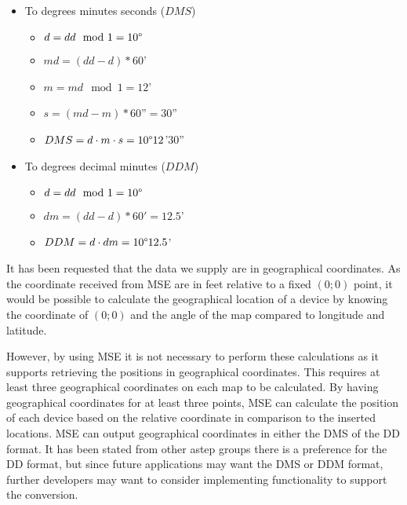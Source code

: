 \begin{itemize}
\begin{itemize}
		\item To degrees minutes seconds ($DMS$)
		\begin{itemize}
			\setlength\itemsep{0.00005em}
			\item $ d = dd \mod 1 = 10\degree $
			\item $ md = (dd - d) * 60$' 
			\item $ m = md \mod 1 = 12$' 
			\item $ s = (md - m) * 60$''$ = 30$''
			\item $ DMS = d \cdot m \cdot s = 10\degree 12$'$ 30$'' 
		\end{itemize}
		\item To degrees decimal minutes ($DDM$)
		\begin{itemize}
			\setlength\itemsep{0.00005em}
			\item $ d = dd \mod 1 = 10\degree $
			\item $ dm = (dd - d) * 60' = 12.5$'
			\item $ DDM = d \cdot dm = 10\degree 12.5$'
		\end{itemize}
	\end{itemize}
\end{itemize}

It has been requested that the data we supply are in geographical coordinates.
As the coordinate received from MSE are in feet relative to a fixed $(0;0)$ point, it would be possible to calculate the geographical location of a device by knowing the coordinate of $(0;0)$ and the angle of the map compared to longitude and latitude. 

However, by using MSE it is not necessary to perform these calculations as it supports retrieving the positions in geographical coordinates. This requires at least three geographical coordinates on each map to be calculated. By having geographical coordinates for at least three points, MSE can calculate the position of each device based on the relative coordinate in comparison to the inserted locations\cite{geo_cisco}. 
MSE can output geographical coordinates in either the DMS of the DD format\cite{cisco_geo_type}. It has been stated from other astep groups there is a preference for the DD format, but since future applications may want the DMS or DDM format, further developers may want to consider implementing functionality to support the conversion. 
